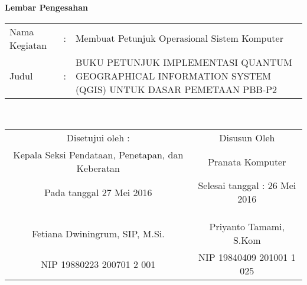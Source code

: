 \begin{center}
{\huge \bfseries Lembar Pengesahan}\\[0.4cm]

\begin{tabular}{l c p{10cm}}
  Nama Kegiatan & : & Membuat Petunjuk Operasional Sistem Komputer \\
  Judul & : & BUKU PETUNJUK IMPLEMENTASI QUANTUM GEOGRAPHICAL INFORMATION SYSTEM (QGIS) UNTUK DASAR PEMETAAN PBB-P2 \\
\end{tabular}\\[2cm]

\begin{tabular}{c c}
  Disetujui oleh : & Disusun Oleh \\
  Kepala Seksi Pendataan, Penetapan, dan Keberatan & Pranata Komputer \\
  Pada tanggal 27 Mei 2016 & Selesai tanggal : 26 Mei 2016 \\
  & \\
  & \\
  & \\
  Fetiana Dwiningrum, SIP, M.Si. & Priyanto Tamami, S.Kom \\
  NIP 19880223 200701 2 001 & NIP 19840409 201001 1 025
\end{tabular}

\end{center}